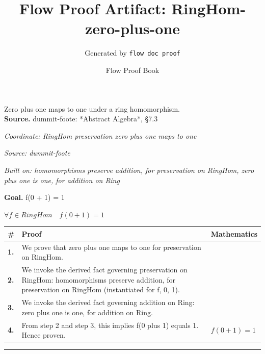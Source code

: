 \documentclass[11pt]{article}
\title{Flow Proof Artifact: RingHom-zero-plus-one}
\author{Generated by \texttt{flow doc proof}}
\date{Flow Proof Book}
\theoremstyle{definition}
\begin{document}
\maketitle
Zero plus one maps to one under a ring homomorphism.\\[0.5em]
\textbf{Source.} dummit-foote: *Abstract Algebra*, §7.3\\[0.5em]
\bigskip
{}\par
\smallskip\noindent\textit{Coordinate: RingHom \cdot preservation \cdot zero plus one maps to one}\par
\smallskip\noindent\textit{Source: dummit-foote}\par
\smallskip\noindent\textit{Built on: homomorphisms preserve addition, for preservation on RingHom, zero plus one is one, for addition on Ring}\par
\medskip
\noindent\textbf{Goal.} f(0 + 1) = 1\par
\noindent$\displaystyle \forall f \in RingHom\quad f(0 + 1) = 1$\par
\medskip
\noindent
\begin{tabular}{@{} >{\raggedright\arraybackslash}p{} >{\raggedright\arraybackslash}p{} >{\raggedleft\arraybackslash}p{} @{}}
\textbf{\#} & \textbf{Proof} & \textbf{Mathematics} \\
\midrule
\textbf{1.} & We prove that zero plus one maps to one for preservation on RingHom. & \\[0.45em]
\textbf{2.} & We invoke the derived fact governing preservation on RingHom: homomorphisms preserve addition, for preservation on RingHom (instantiated for f, 0, 1). & \\[0.45em]
\textbf{3.} & We invoke the derived fact governing addition on Ring: zero plus one is one, for addition on Ring. & \\[0.45em]
\textbf{4.} & From step 2 and step 3, this implies f(0 plus 1) equals 1. Hence proven. & $\displaystyle f(0 + 1) = 1$ \\[0.45em]
\bottomrule
\end{tabular}
\label{thm:RingHom-preservation-zero_plus_one_maps_to_one}
\par\medskip\hrule
\end{document}
